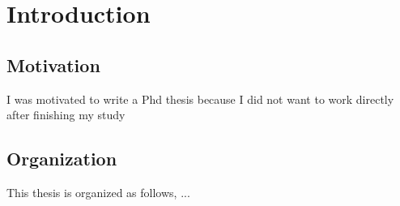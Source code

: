 

\chapter{Introduction}
\section{Motivation}
I was motivated to write a Phd thesis because I did not want to work directly after finishing my study
\section{Organization}
This thesis is organized as follows, ...
